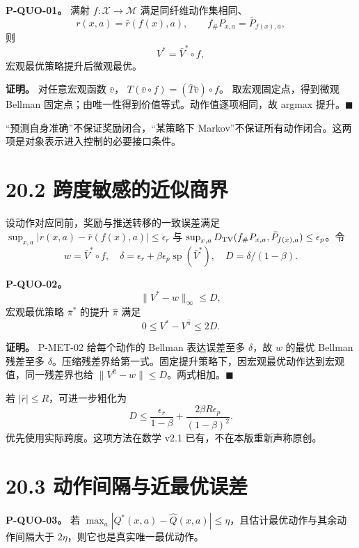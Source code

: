 \documentclass[
  11pt,
  oneside]{book}
\begin{document}
\textbf{P-QUO-01。} 满射 \(f:\mathcal X\to\mathcal M\) 满足同纤维动作集相同、 \[r(x,a)=\bar r(f(x),a),\qquad
f_\#P_{x,a}=\bar P_{f(x),a},\] 则 \[V^*=\bar V^*\circ f,\] 宏观最优策略提升后微观最优。

\textbf{证明。} 对任意宏观函数 \(\bar v\)， \(T(\bar v\circ f)=(\bar T\bar v)\circ f\)。 取宏观固定点，得到微观 Bellman 固定点；由唯一性得到价值等式。动作值逐项相同，故 argmax 提升。\(\blacksquare\)

``预测自身准确''不保证奖励闭合，``某策略下 Markov''不保证所有动作闭合。这两项是对象表示进入控制的必要接口条件。

\section{20.2 跨度敏感的近似商界}\label{ux8de8ux5ea6ux654fux611fux7684ux8fd1ux4f3cux5546ux754c}

设动作对应同前，奖励与推送转移的一致误差满足 \(\sup_{x,a}|r(x,a)-\bar r(f(x),a)|\le\epsilon_r\) 与 \(\sup_{x,a}D_{\rm TV}(f_\#P_{x,a},\bar P_{f(x),a})\le\epsilon_p\)。令 \[w=\bar V^*\circ f,\quad
\delta=\epsilon_r+\beta\epsilon_p\operatorname{sp}(\bar V^*),\quad
D=\delta/(1-\beta).\]

\hypertarget{p-quo-02}{}\label{p-quo-02}

\textbf{P-QUO-02。} \[\|V^*-w\|_\infty\le D,\] 宏观最优策略 \(\bar\pi^*\) 的提升 \(\widehat\pi\) 满足 \[0\le V^*-V^{\widehat\pi}\le2D.\]

\textbf{证明。} P-MET-02 给每个动作的 Bellman 表达误差至多 \(\delta\)，故 \(w\) 的最优 Bellman 残差至多 \(\delta\)。压缩残差界给第一式。固定提升策略下，因宏观最优动作达到宏观值，同一残差界也给 \(\|V^{\widehat\pi}-w\|\le D\)。两式相加。\(\blacksquare\)

若 \(|\bar r|\le R\)，可进一步粗化为 \[D\le\frac{\epsilon_r}{1-\beta}
+\frac{2\beta R\epsilon_p}{(1-\beta)^2}.\] 优先使用实际跨度。这项方法在数学 v2.1 已有，不在本版重新声称原创。

\section{20.3 动作间隔与近最优误差}\label{ux52a8ux4f5cux95f4ux9694ux4e0eux8fd1ux6700ux4f18ux8befux5dee}

\hypertarget{p-quo-03}{}\label{p-quo-03}

\textbf{P-QUO-03。} 若 \(\max_a|Q^*(x,a)-\widehat Q(x,a)|\le\eta\)，且估计最优动作与其余动作间隔大于 \(2\eta\)，则它也是真实唯一最优动作。
\end{document}
